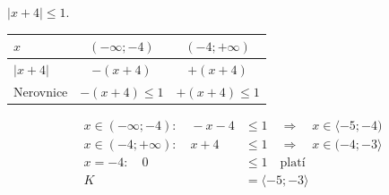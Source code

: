 \documentclass[11pt,a4paper]{article}
\begin{document}
\begin{zadaniReseniBox}[title={Samostatná práce 3}]
$|x+4|\le1$.
\tcblower
\begin{center}
\begingroup\footnotesize
\renewcommand{\arraystretch}{1.32}
\begin{tabular}{@{}lcc@{}}
\toprule
$x$ & $(-\infty;-4)$ & $(-4;+\infty)$ \\
\midrule
$|x + 4|$ & $-(x + 4)$ & $+(x + 4)$ \\
\midrule
Nerovnice & $-(x + 4)\le1$ & $+(x + 4)\le1$ \\
\bottomrule
\end{tabular}
\endgroup
\end{center}
\[\begin{aligned}x\in (-\infty;-4):\quad - x - 4 &\le 1\quad\Longrightarrow\quad x\in\langle-5;-4)\\[2pt]
x\in (-4;+\infty):\quad x + 4 &\le 1\quad\Longrightarrow\quad x\in(-4;-3\rangle\\[2pt]
x=-4:\quad 0 &\le 1\quad\text{platí}\\[2pt]
K&=\langle-5;-3\rangle\end{aligned}\]
\end{zadaniReseniBox}
\end{document}
